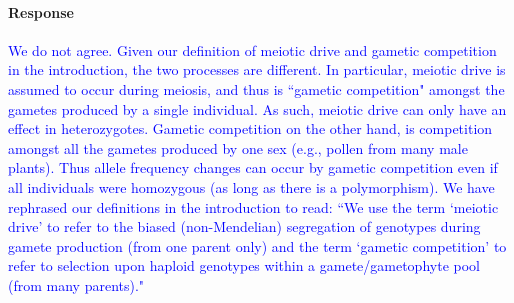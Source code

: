 \documentclass[10pt,letterpaper]{article}
\begin{document}
\noindent\paragraph{Response}
\textcolor{blue}{We do not agree. 
Given our definition of meiotic drive and gametic competition in the introduction, the two processes are different.
In particular, meiotic drive is assumed to occur during meiosis, and thus is ``gametic competition" amongst the gametes produced by a single individual. 
As such, meiotic drive can only have an effect in heterozygotes.
Gametic competition on the other hand, is competition amongst all the gametes produced by one sex (e.g., pollen from many male plants).
Thus allele frequency changes can occur by gametic competition even if all individuals were homozygous (as long as there is a polymorphism).
We have rephrased our definitions in the introduction to read: ``We use the term `meiotic drive' to refer to the biased (non-Mendelian) segregation of genotypes during gamete production (from one parent only) and the term `gametic competition' to refer to selection upon haploid genotypes within a gamete/gametophyte pool (from many parents)."
}
\end{document}
